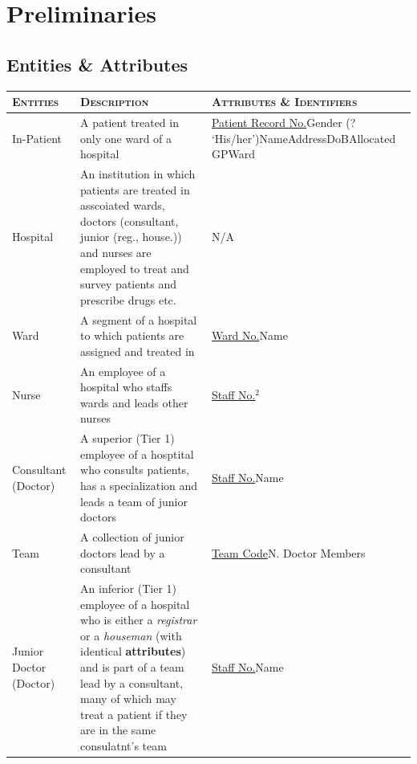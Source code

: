 \documentclass[11pt, english]{article}
\begin{document}
\newpage

\section{Preliminaries}

	\subsection{Entities \& Attributes}

	\begin{center}
		\scriptsize
		\renewcommand{\arraystretch}{1.25}
	\begin{longtable}{lp{5cm}p{4cm}}
		\textsc{Entities} & \textsc{Description} & \textsc{Attributes \& Identifiers}\\
		\hline
		\hline
		In-Patient & A patient treated in only one ward of a hospital & \underline{Patient Record No.}\newline Gender (? `His/her')\newline Name\newline Address\newline DoB\newline Allocated GP\newline Ward\\
		\hline
		Hospital & An institution in which patients are treated in asscoiated wards, doctors (consultant, junior (reg., house.)) and nurses are employed to treat and survey patients and prescribe drugs etc. & N/A\\
		\hline
		Ward & A segment of a hospital to which patients are assigned and treated in & \underline{Ward No.}\newline Name\\
		\hline
		Nurse & An employee of a hospital who staffs wards and leads other nurses & \underline{Staff No.}$^{2}$\\
		\hline
		Consultant (Doctor) & A superior (Tier 1) employee of a hosptital who consults patients, has a specialization and leads a team of junior doctors & \underline{Staff No.}\newline Name\\
		\hline
		Team & A collection of junior doctors lead by a consultant & \underline{Team Code}\newline N. Doctor Members\\
		\hline
		Junior Doctor (Doctor) & An inferior (Tier 1) employee of a hospital who is either a \textit{registrar} or a \textit{houseman} (with identical \textbf{attributes}) and is part of a team lead by a consultant, many of which may treat a patient if they are in the same consulatnt's team & \underline{Staff No.}\newline Name\\

\end{longtable}
\end{center}
\end{document}
